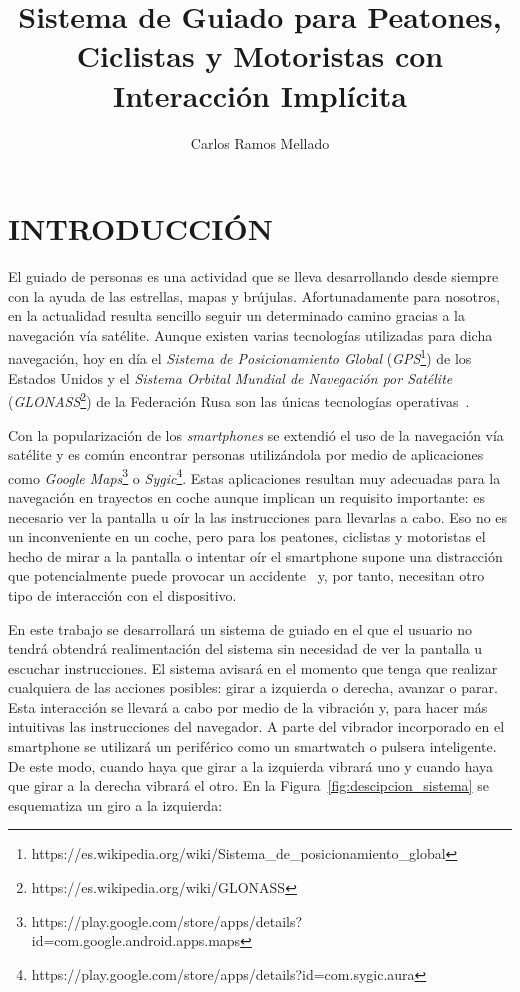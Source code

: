 \documentclass{pre-tfg}
\title{Sistema de Guiado para Peatones, Ciclistas y Motoristas con Interacción Implícita}
\author{Carlos Ramos Mellado}
\begin{document}
\maketitle
\tableofcontents

\newpage

\section{INTRODUCCIÓN}

El guiado de personas es una actividad que se lleva desarrollando desde siempre con la
ayuda de las estrellas, mapas y brújulas. Afortunadamente para nosotros, en la actualidad
resulta sencillo seguir un determinado camino gracias a la navegación vía satélite. Aunque
existen varias tecnologías utilizadas para dicha navegación, hoy en día el \textit{Sistema
  de Posicionamiento Global}
(\textit{GPS}\footnote{https://es.wikipedia.org/wiki/Sistema\_de\_posicionamiento\_global})
de los Estados Unidos y el \textit{Sistema Orbital Mundial de Navegación por Satélite}
(\textit{GLONASS}\footnote{https://es.wikipedia.org/wiki/GLONASS}) de la Federación Rusa
son las únicas tecnologías operativas~\cite{SPSA}.

Con la popularización de los \emph{smartphones} se extendió el uso de la navegación vía
satélite y es común encontrar personas utilizándola por medio de aplicaciones como
\textit{Google
  Maps}\footnote{https://play.google.com/store/apps/details?id=com.google.android.apps.maps}
o
\textit{Sygic}\footnote{https://play.google.com/store/apps/details?id=com.sygic.aura}. Estas
aplicaciones resultan muy adecuadas para la navegación en trayectos en coche aunque
implican un requisito importante: es necesario ver la pantalla u oír la las instrucciones
para llevarlas a cabo. Eso no es un inconveniente en un coche, pero para los peatones,
ciclistas y motoristas el hecho de mirar a la pantalla o intentar oír el smartphone supone
una distracción que potencialmente puede provocar un accidente~\cite{Valcarcel12} y, por
tanto, necesitan otro tipo de interacción con el dispositivo.



En este trabajo se desarrollará un sistema de guiado en el que el usuario no tendrá
obtendrá realimentación del sistema sin necesidad de ver la pantalla u escuchar
instrucciones. El sistema avisará en el momento que tenga que realizar cualquiera de las
acciones posibles: girar a izquierda o derecha, avanzar o parar. Esta interacción se
llevará a cabo por medio de la vibración y, para hacer más intuitivas las instrucciones
del navegador. A parte del vibrador incorporado en el smartphone se utilizará un
periférico como un smartwatch o pulsera inteligente. De este modo, cuando haya que girar a
la izquierda vibrará uno y cuando haya que girar a la derecha vibrará el otro. En la
Figura~\ref{fig:descipcion_sistema} se esquematiza un giro a la izquierda:
\end{document}
